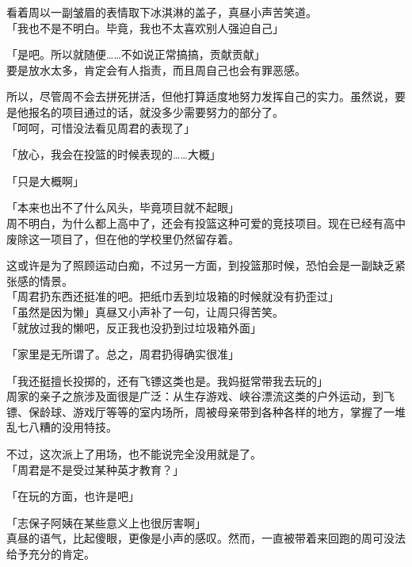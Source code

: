 看着周以一副皱眉的表情取下冰淇淋的盖子，真昼小声苦笑道。\\

「我也不是不明白。毕竟，我也不太喜欢别人强迫自己」

「是吧。所以就随便……不如说正常搞搞，贡献贡献」\\

要是放水太多，肯定会有人指责，而且周自己也会有罪恶感。

所以，尽管周不会去拼死拼活，但他打算适度地努力发挥自己的实力。虽然说，要是他报名的项目通过的话，就没多少需要努力的部分了。\\

「呵呵，可惜没法看见周君的表现了」

「放心，我会在投篮的时候表现的……大概」

「只是大概啊」

「本来也出不了什么风头，毕竟项目就不起眼」\\

周不明白，为什么都上高中了，还会有投篮这种可爱的竞技项目。现在已经有高中废除这一项目了，但在他的学校里仍然留存着。

这或许是为了照顾运动白痴，不过另一方面，到投篮那时候，恐怕会是一副缺乏紧张感的情景。\\

「周君扔东西还挺准的吧。把纸巾丢到垃圾箱的时候就没有扔歪过」\\

「虽然是因为懒」真昼又小声补了一句，让周只得苦笑。\\

「就放过我的懒吧，反正我也没扔到过垃圾箱外面」

「家里是无所谓了。总之，周君扔得确实很准」

「我还挺擅长投掷的，还有飞镖这类也是。我妈挺常带我去玩的」\\

周家的亲子之旅涉及面很是广泛：从生存游戏、峡谷漂流这类的户外运动，到飞镖、保龄球、游戏厅等等的室内场所，周被母亲带到各种各样的地方，掌握了一堆乱七八糟的没用特技。

不过，这次派上了用场，也不能说完全没用就是了。\\

「周君是不是受过某种英才教育？」

「在玩的方面，也许是吧」

「志保子阿姨在某些意义上也很厉害啊」\\

真昼的语气，比起傻眼，更像是小声的感叹。然而，一直被带着来回跑的周可没法给予充分的肯定。\\

